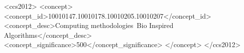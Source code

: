 \documentclass[sigconf]{acmart}
\begin{document}
%
%
\begin{CCSXML}
<ccs2012>
<concept>
<concept_id>10010147.10010178.10010205.10010207</concept_id>
<concept_desc>Computing methodologies~Bio Inspired Algorithms</concept_desc>
<concept_significance>500</concept_significance>
</concept>
</ccs2012>
\end{CCSXML}



\maketitle




 
\end{document}

